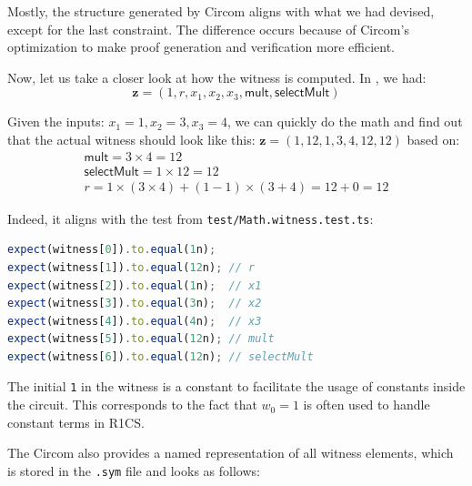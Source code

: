 \documentclass[../../book.tex]{subfiles}
\begin{document}
Mostly, the structure generated by Circom aligns with what we had devised, except for the last constraint.
The difference occurs because of Circom's optimization to make proof generation and verification more efficient.

Now, let us take a closer look at how the witness is computed. In , we had:
\[ \mathbf{z} = (1, r, x_1, x_2, x_3, \mathsf{mult}, \mathsf{selectMult}) \]

Given the inputs: $x_1 = 1, x_2 = 3, x_3 = 4$, we can quickly do the math
and find out that the actual witness should look like this: $\mathbf{z} =
(1, 12, 1, 3, 4, 12, 12)$ based on:
\begin{gather*}
    \mathsf{mult} = 3 \times 4 = 12 \\
    \mathsf{selectMult} = 1 \times 12 = 12 \\
    r = 1 \times (3 \times 4) + (1 - 1) \times (3 + 4) = 12 + 0 = 12
\end{gather*}

Indeed, it aligns with the test from \texttt{test/Math.witness.test.ts}:

\begin{center}
    \begin{tcolorbox}[enhanced,
        width=0.75\textwidth,
        title={\textbf{test/Math.witness.test.ts}},
        coltitle=gray!25!black,
        attach boxed title to top center={yshift=-2mm,yshifttext=-1mm},
        boxed title style={size=small,colframe=gray!75!black,
        colback=Green!30!white,boxrule=1pt},
        top=-0.3cm,
        bottom=-0.3cm]
        \begin{lstlisting}[language=TypeScript,numbers=none,basicstyle=\ttfamily\footnotesize]
expect(witness[0]).to.equal(1n);
expect(witness[1]).to.equal(12n); // r
expect(witness[2]).to.equal(1n);  // x1
expect(witness[3]).to.equal(3n);  // x2
expect(witness[4]).to.equal(4n);  // x3
expect(witness[5]).to.equal(12n); // mult
expect(witness[6]).to.equal(12n); // selectMult
        \end{lstlisting}
    \end{tcolorbox}
\end{center}

The initial \texttt{1} in the witness is a constant to facilitate the usage of constants inside the circuit.
This corresponds to the fact that $w_0=1$ is often used to handle constant terms in R1CS.

The Circom also provides a named representation of all witness elements, which is stored in the \texttt{.sym} file and looks as follows:
\end{document}

